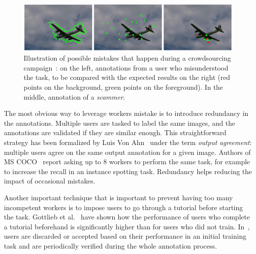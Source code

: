 \begin{figure}[ht]
\centering
\includegraphics[width=\columnwidth]{assets/img/crowdsourcing-errors.png}
\caption{Illustration of possible mistakes that happen during
	a crowdsourcing campaign~\cite{carlier2016assessment}:
	on the left, annotations from a user who misunderstood the task,
	to be compared with the expected results on the right
	(red points on the background, green points on the foreground).
	In the middle, annotation of a \textit{scammer}.}%
\label{fig:cs-errors}
\end{figure}

The most obvious way to leverage workers mistake
is to introduce redundancy in the annotations.
Multiple users are tasked to label the same images,
and the annotations are validated if they are similar enough.
This straightforward strategy has been formalized by Luis Von Ahn~\cite{von2008designing}
under the term \textit{output agreement}:
multiple users agree on the same output annotation for a given image.
Authors of MS COCO~\cite{lin2014microsoft}
report asking up to 8 workers to perform the same task,
for example to increase the recall in an instance spotting task.
Redundancy helps reducing the impact of occasional mistakes.


Another important technique that is important to prevent
having too many incompetent workers is to impose users
to go through a tutorial before starting the task.
Gottlieb et al.~\cite{gottlieb2012pushing} have shown
how the performance of users who complete a tutorial beforehand
is significantly higher than for users who did not train.
In~\cite{lin2014mscoco}, users are discarded or accepted
based on their performance in an initial training task
and are periodically verified during the whole annotation process.


